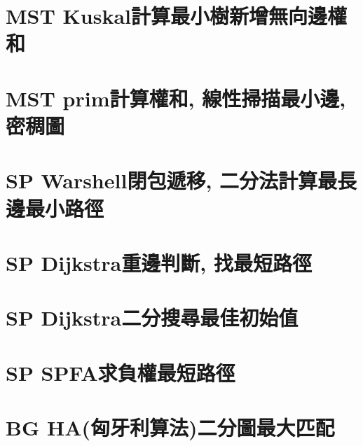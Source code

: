 \documentclass{article}
\begin{document}
\begin{multicols}{2}
\section{MST Kuskal計算最小樹新增無向邊權和}



\section{MST prim計算權和, 線性掃描最小邊, 密稠圖}



\section{SP Warshell閉包遞移, 二分法計算最長邊最小路徑}



\section{SP Dijkstra重邊判斷, 找最短路徑}



\section{SP Dijkstra二分搜尋最佳初始值}



\section{SP SPFA求負權最短路徑}



\section{BG HA(匈牙利算法)二分圖最大匹配}




\end{multicols}
\end{document}
